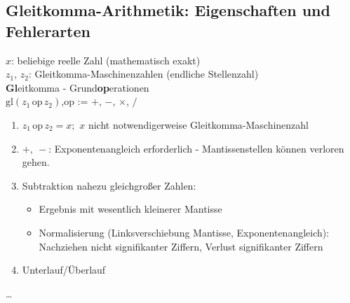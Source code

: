 \subsection{Gleitkomma-Arithmetik: Eigenschaften und Fehlerarten}
$x$: beliebige reelle Zahl (mathematisch exakt)\\
$z_1,\,z_2$: Gleitkomma-Maschinenzahlen (endliche Stellenzahl)\\
\textbf{Gl}eitkomma - Grund\textbf{op}erationen\\
$\text{gl}(z_1\, \text{op}\, z_2)$,\quad op := $+$, $-$, $\times$, $/$
\begin{enumerate}[label=\alph*)]
	\item $z_1 \, \text{op}\, z_2 = x;$ \quad $x$ nicht notwendigerweise Gleitkomma-Maschinenzahl
	\item $+,\ -$: Exponentenangleich erforderlich - Mantissenstellen können verloren gehen.
	\item Subtraktion nahezu gleichgroßer Zahlen:
		\begin{itemize}
			\item Ergebnis mit wesentlich kleinerer Mantisse
			\item Normalisierung (Linksverschiebung Mantisse, Exponentenangleich): Nachziehen nicht signifikanter Ziffern, Verlust signifikanter Ziffern
		\end{itemize}
	\item Unterlauf/Überlauf
\end{enumerate}

\ldots
